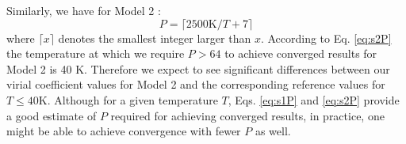             Similarly, we have for Model 2 \cite{Garberoglio2012}:
            \begin{equation}
            \label{eq:s2P}
                P = \lceil 2500 \textrm{K}/T + 7 \rceil
            \end{equation}
            where $\lceil x \rceil$ denotes the smallest integer larger than $x$.
According to Eq. \eqref{eq:s2P} the temperature at which we require $P > 64$ to achieve converged results for Model 2 is 40 K. Therefore we expect to see significant differences between our virial coefficient values for Model 2 and the corresponding reference values for $T \le 40 $K. Although for a given temperature $T$, Eqs. \eqref{eq:s1P} and \eqref{eq:s2P} provide a good estimate of $P$ required for achieving converged results, in practice, one might be able to achieve convergence with fewer $P$ as well.

